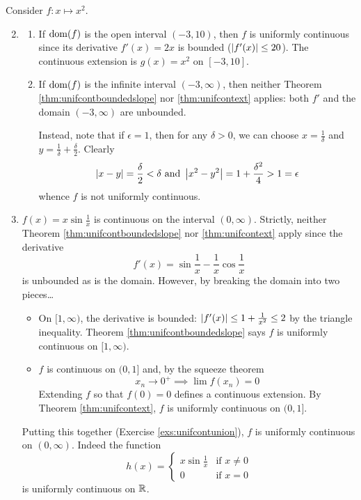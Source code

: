\begin{examples}{}{}
	\exstart Consider $f:x\mapsto x^2$. 
	\begin{enumerate}\setcounter{enumi}{1}
	  \item[]\begin{enumerate}
	    \item If $\operatorname{dom}(f)$ is the open interval $(-3,10)$, then $f$ is uniformly continuous since its derivative $f'(x)=2x$ is bounded ($\left| f'(x)\right|\le 20$). The continuous extension is $g(x)=x^2$ on $[-3,10]$.
	    \item	If $\operatorname{dom}(f)$ is the infinite interval $(-3,\infty)$, then neither Theorem \ref{thm:unifcontboundedslope} nor \ref{thm:unifcontext} applies: both $f'$ and the domain $(-3,\infty)$ are unbounded.\par
			Instead, note that if $\epsilon=1$, then for any $\delta>0$, we can choose $x=\frac 1\delta$ and $y=\frac 1\delta+\frac\delta 2$. Clearly
			\[
				\left| x-y\right|=\frac\delta 2<\delta\text{ and }
				\left| x^2-y^2\right|=1+\frac{\delta^2}4>1=\epsilon
			\]
			whence $f$ is not uniformly continuous.
	  \end{enumerate}
		\item $f(x)=x\sin \frac 1x$ is continuous on the interval $(0,\infty)$. Strictly, neither Theorem \ref{thm:unifcontboundedslope} nor \ref{thm:unifcontext} apply since the derivative
		\[
			f'(x)=\sin\frac 1x-\frac 1x\cos\frac 1x
		\]
		is unbounded as is the domain. However, by breaking the domain into two pieces\ldots 
		\begin{itemize}
		  \item On $[1,\infty)$, the derivative is bounded: $\left| f'(x)\right|\le 1+\frac 1{x^2}\le 2$ by the triangle inequality. Theorem \ref{thm:unifcontboundedslope} says $f$ is uniformly continuous on $[1,\infty)$.
		  \item $f$ is continuous on $(0,1]$ and, by the squeeze theorem
		  \[
		  	x_n\to 0^+\implies \lim f(x_n)=0
		  \]
		  Extending $f$ so that $f(0)=0$ defines a continuous extension. By Theorem \ref{thm:unifcontext}, $f$ is uniformly continuous on $(0,1]$.
	 	\end{itemize}
	 	Putting this together (Exercise \ref{exs:unifcontunion}), $f$ is uniformly continuous on $(0,\infty)$. Indeed the function
	 	\[
	 		h(x)=
	 		\begin{cases}
	 			x\sin\frac 1x&\text{if }x\neq 0\\
	 			0&\text{if }x=0
	 		\end{cases}
	 	\]
	 	is uniformly continuous on $\mathbb{R}$.
	\end{enumerate}
\end{examples}


